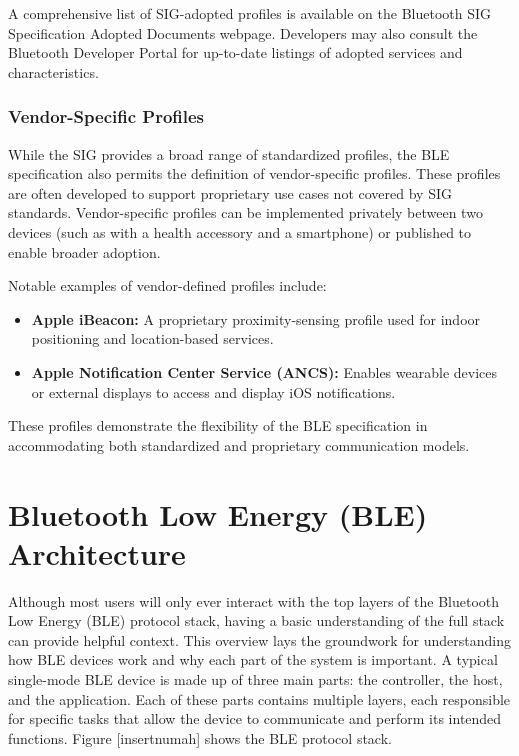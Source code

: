 A comprehensive list of SIG-adopted profiles is available on the Bluetooth SIG Specification Adopted Documents webpage. Developers may also consult the Bluetooth Developer Portal for up-to-date listings of adopted services and characteristics.

\subsubsection{Vendor-Specific Profiles}

While the SIG provides a broad range of standardized profiles, the BLE specification also permits the definition of vendor-specific profiles. These profiles are often developed to support proprietary use cases not covered by SIG standards. Vendor-specific profiles can be implemented privately between two devices (such as with a health accessory and a smartphone) or published to enable broader adoption.

Notable examples of vendor-defined profiles include:

\begin{itemize}
    \item \textbf{Apple iBeacon:} A proprietary proximity-sensing profile used for indoor positioning and location-based services.
    \item \textbf{Apple Notification Center Service (ANCS):} Enables wearable devices or external displays to access and display iOS notifications.
\end{itemize}

These profiles demonstrate the flexibility of the BLE specification in accommodating both standardized and proprietary communication models.

\section{Bluetooth Low Energy (BLE) Architecture}

Although most users will only ever interact with the top layers of the Bluetooth Low Energy (BLE) protocol stack, having a basic understanding of the full stack can provide helpful context. This overview lays the groundwork for understanding how BLE devices work and why each part of the system is important. A typical single-mode BLE device is made up of three main parts: the controller, the host, and the application. Each of these parts contains multiple layers, each responsible for specific tasks that allow the device to communicate and perform its intended functions. Figure [insertnumah] shows the BLE protocol stack.

